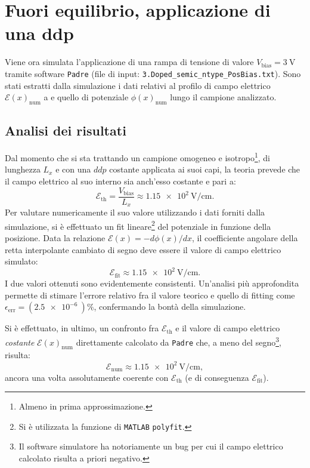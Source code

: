 \documentclass[a4paper,11pt]{report}
\begin{document}
\section{Fuori equilibrio, applicazione di una ddp}
Viene ora simulata l'applicazione di una rampa di tensione di valore $V_{\text{bias}} = \SI{3}{\volt}$ tramite software \texttt{Padre} (file di input: \texttt{3.Doped\_semic\_ntype\_PosBias.txt}). Sono stati estratti dalla simulazione i dati relativi al profilo di campo elettrico $\mathcal{E}(x)_{\text{num}}$ a e quello di potenziale $\phi(x)_{\text{num}}$ lungo il campione analizzato. 

\subsection{Analisi dei risultati}
Dal momento che si sta trattando un campione omogeneo e isotropo\footnote{Almeno in prima approssimazione.}, di lunghezza $L_x$ e con una $ddp$ costante applicata ai suoi capi, la teoria prevede che il campo elettrico al suo interno sia anch'esso costante e pari a:
\begin{equation}
\mathcal{E}_{\text{th}} = \frac{V_{\text{bias}}}{L_x} \approx \SI{1.15e2}{\volt\per\centi\meter}.
\end{equation}
Per valutare numericamente il suo valore utilizzando i dati forniti dalla simulazione, si è effettuato un fit lineare\footnote{Si è utilizzata la funzione di \texttt{MATLAB} \texttt{polyfit}.} del potenziale in funzione della posizione. Data la relazione $\mathcal{E}(x)= -d\phi(x)/dx$, il coefficiente angolare della retta interpolante cambiato di segno deve essere il valore di campo elettrico simulato:
\begin{equation}
\mathcal{E}_{\text{fit}} \approx \SI{1.15e2}{\volt\per\centi\meter}.
\end{equation}
I due valori ottenuti sono evidentemente consistenti. Un'analisi più approfondita permette di stimare l'errore relativo fra il valore teorico e quello di fitting come $\epsilon_{\text{err}} = (\SI{2.5e-6}{})\% $, confermando la bontà della simulazione. 

Si è effettuato, in ultimo, un confronto fra $\mathcal{E}_{\text{th}}$ e il valore di campo elettrico \textit{costante} $\mathcal{E}(x)_{\text{num}}$ direttamente calcolato da \texttt{Padre} che, a meno del segno\footnote{Il software simulatore ha notoriamente un bug per cui il campo elettrico calcolato risulta a priori negativo.}, risulta: 
\begin{equation}
\mathcal{E}_{\text{num}} \approx \SI{1.15e2}{\volt\per\centi\meter},
\end{equation}
ancora una volta assolutamente coerente con $\mathcal{E}_{\text{th}}$ (e di conseguenza $\mathcal{E}_{\text{fit}}$).
\end{document}
